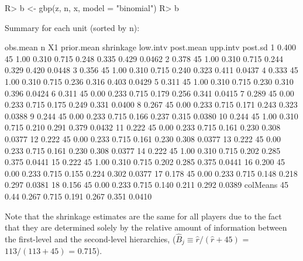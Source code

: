\documentclass[article]{jss}
\begin{document}
\begin{CodeChunk}
\begin{CodeInput}
R> b <- gbp(z, n, x, model = "binomial")
R> b
\end{CodeInput}
\begin{CodeOutput}
Summary for each unit (sorted by n):

         obs.mean  n   X1 prior.mean shrinkage low.intv post.mean upp.intv post.sd
1           0.400 45 1.00      0.310     0.715    0.248     0.335    0.429  0.0462
2           0.378 45 1.00      0.310     0.715    0.244     0.329    0.420  0.0448
3           0.356 45 1.00      0.310     0.715    0.240     0.323    0.411  0.0437
4           0.333 45 1.00      0.310     0.715    0.236     0.316    0.403  0.0429
5           0.311 45 1.00      0.310     0.715    0.230     0.310    0.396  0.0424
6           0.311 45 0.00      0.233     0.715    0.179     0.256    0.341  0.0415
7           0.289 45 0.00      0.233     0.715    0.175     0.249    0.331  0.0400
8           0.267 45 0.00      0.233     0.715    0.171     0.243    0.323  0.0388
9           0.244 45 0.00      0.233     0.715    0.166     0.237    0.315  0.0380
10          0.244 45 1.00      0.310     0.715    0.210     0.291    0.379  0.0432
11          0.222 45 0.00      0.233     0.715    0.161     0.230    0.308  0.0377
12          0.222 45 0.00      0.233     0.715    0.161     0.230    0.308  0.0377
13          0.222 45 0.00      0.233     0.715    0.161     0.230    0.308  0.0377
14          0.222 45 1.00      0.310     0.715    0.202     0.285    0.375  0.0441
15          0.222 45 1.00      0.310     0.715    0.202     0.285    0.375  0.0441
16          0.200 45 0.00      0.233     0.715    0.155     0.224    0.302  0.0377
17          0.178 45 0.00      0.233     0.715    0.148     0.218    0.297  0.0381
18          0.156 45 0.00      0.233     0.715    0.140     0.211    0.292  0.0389
colMeans          45 0.44      0.267     0.715    0.191     0.267    0.351  0.0410
\end{CodeOutput}
\end{CodeChunk}
Note that the shrinkage estimates are the same for all players due to the fact that they are determined solely by the relative amount of information between the first-level and the second-level hierarchies, ($\hat{B}_{j}\equiv \hat{r} / (\hat{r}+45)$ = $113 / (113+45)$ = 0.715). 
\end{document}
